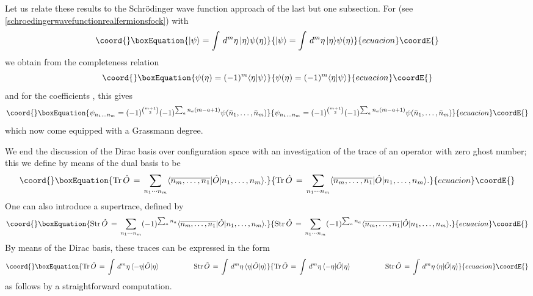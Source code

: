 \documentclass[a4paper,10pt]{article}
\begin{document}
Let us relate these results to the Schr\"odinger wave function approach of the last but 
one subsection. For \myHighlight{$\psi(\eta)$}\coordHE{} (see \eqref{schroedingerwavefunctionrealfermionsfock}) 
with 
\begin{equation}\coord{}\boxEquation{
|\psi\rangle=\int\,d^{m}\eta\,|\eta\rangle\psi(\eta)
}{
|\psi\rangle=\int\,d^{m}\eta\,|\eta\rangle\psi(\eta)
}{ecuacion}\coordE{}\end{equation}
we obtain from the completeness relation
\begin{equation}\coord{}\boxEquation{
\psi(\eta)=(-1)^m\langle\eta|\psi\rangle
}{
\psi(\eta)=(-1)^m\langle\eta|\psi\rangle
}{ecuacion}\coordE{}\end{equation}
and for the coefficients \coordHE{}, this gives
\begin{equation}\coord{}\boxEquation{
\psi_{n_1\ldots n_m}=(-1)^{{m+1 \choose 2}}(-1)^{\sum_an_a(m-
a+1)}\psi(\bar{n}_1,\ldots,\bar{n}_m)
}{
\psi_{n_1\ldots n_m}=(-1)^{{m+1 \choose 2}}(-1)^{\sum_an_a(m-
a+1)}\psi(\bar{n}_1,\ldots,\bar{n}_m)
}{ecuacion}\coordE{}\end{equation}
which now come equipped with a Grassmann degree.

We end the discussion of the Dirac basis over configuration space with an investigation of 
the trace of an operator \coordHE{} with zero ghost number; this we define by means of the 
dual basis to be
\begin{equation}\coord{}\boxEquation{
\mathrm{Tr}\,\hat{O}\,=\,\sum_{n_1\cdots 
n_m}\langle\overline{n_m,\ldots,n_1}|\hat{O}|n_1,\ldots,n_m\rangle.
}{
\mathrm{Tr}\,\hat{O}\,=\,\sum_{n_1\cdots 
n_m}\langle\overline{n_m,\ldots,n_1}|\hat{O}|n_1,\ldots,n_m\rangle.
}{ecuacion}\coordE{}\end{equation}
One can also introduce a supertrace, defined by
\begin{equation}\coord{}\boxEquation{
\mathrm{Str}\,\hat{O}\,=\,\sum_{n_1\cdots n_m}(-
1)^{\sum_an_a}\langle\overline{n_m,\ldots,n_1}|\hat{O}|n_1,\ldots,n_m\rangle.
}{
\mathrm{Str}\,\hat{O}\,=\,\sum_{n_1\cdots n_m}(-
1)^{\sum_an_a}\langle\overline{n_m,\ldots,n_1}|\hat{O}|n_1,\ldots,n_m\rangle.
}{ecuacion}\coordE{}\end{equation}
By means of the Dirac basis, these traces can be expressed in the form
\begin{equation}\coord{}\boxEquation{\label{traceandsupetraceghostfermionsincoordinatespace}
\mathrm{Tr}\,\hat{O}\,=\,\int\,d^{m}\eta\,\langle-
\eta|\hat{O}|\eta\rangle\qquad\qquad\quad
\mathrm{Str}\,\hat{O}\,=\,\int\,d^{m}\eta\,\langle\eta|\hat{O}|\eta\rangle
}{\mathrm{Tr}\,\hat{O}\,=\,\int\,d^{m}\eta\,\langle-
\eta|\hat{O}|\eta\rangle\qquad\qquad\quad
\mathrm{Str}\,\hat{O}\,=\,\int\,d^{m}\eta\,\langle\eta|\hat{O}|\eta\rangle
}{ecuacion}\coordE{}\end{equation}
as follows by a straightforward computation.
\end{document}
